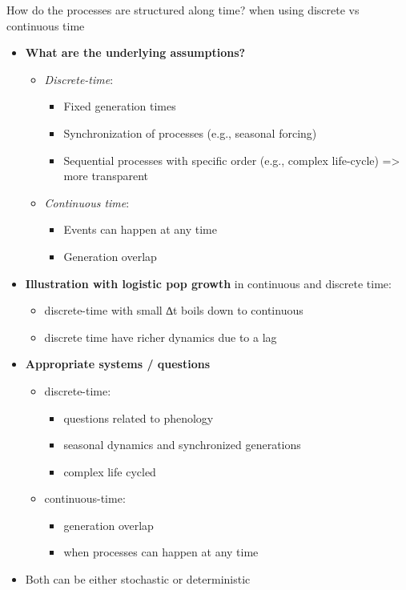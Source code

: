 \documentclass[
]{book}
\providecommand{\tightlist}{%
  \setlength{\itemsep}{0pt}\setlength{\parskip}{0pt}}
\theoremstyle{definition}
\theoremstyle{definition}
\theoremstyle{definition}
\theoremstyle{definition}
\theoremstyle{remark}
\begin{document}
How do the processes are structured along time? when using discrete vs continuous time

\begin{itemize}
\tightlist
\item
  \textbf{What are the underlying assumptions?}

  \begin{itemize}
  \tightlist
  \item
    \emph{Discrete-time}:

    \begin{itemize}
    \tightlist
    \item
      Fixed generation times
    \item
      Synchronization of processes (e.g., seasonal forcing)
    \item
      Sequential processes with specific order (e.g., complex life-cycle) =\textgreater{} more transparent
    \end{itemize}
  \item
    \emph{Continuous time}:

    \begin{itemize}
    \tightlist
    \item
      Events can happen at any time
    \item
      Generation overlap
    \end{itemize}
  \end{itemize}
\item
  \textbf{Illustration with logistic pop growth} in continuous and discrete time:

  \begin{itemize}
  \tightlist
  \item
    discrete-time with small ∆t boils down to continuous
  \item
    discrete time have richer dynamics due to a lag
  \end{itemize}
\item
  \textbf{Appropriate systems / questions}

  \begin{itemize}
  \tightlist
  \item
    discrete-time:

    \begin{itemize}
    \tightlist
    \item
      questions related to phenology
    \item
      seasonal dynamics and synchronized generations
    \item
      complex life cycled
    \end{itemize}
  \item
    continuous-time:

    \begin{itemize}
    \tightlist
    \item
      generation overlap
    \item
      when processes can happen at any time
    \end{itemize}
  \end{itemize}
\item
  Both can be either stochastic or deterministic
\end{itemize}
\end{document}
